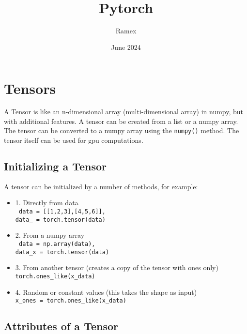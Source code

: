\documentclass{article}
\title{Pytorch}
\author{Ramex}
\date{June 2024}
\begin{document}
\maketitle

\section{Tensors}

A Tensor is like an n-dimensional array (multi-dimensional array) 
in numpy, but with additional features. 
A tensor can be created from a list or a numpy array.
The tensor can be converted to a numpy array using the \texttt{numpy()} 
method. The tensor itself can be used for gpu computations.

\subsection{Initializing a Tensor}

A tensor can be initialized by a number of methods, for example:

\begin{itemize}
    \item 1. Directly from data \\
    \texttt{
        data = [[1,2,3],[4,5,6]], \\
        data\_ = torch.tensor(data)
    }
    \item 2. From a numpy array \\
    \texttt{
        data = np.array(data), \\
        data\_x = torch.tensor(data)
    }
    \item 3. From another tensor (creates a copy of the tensor with ones only) \\
    \texttt{torch.ones\_like(x\_data)}
    \item 4. Random or constant values (this takes the shape as input) \\
    \texttt{x\_ones = torch.ones\_like(x\_data)}
\end{itemize}

\subsection{Attributes of a Tensor}
\end{document}

